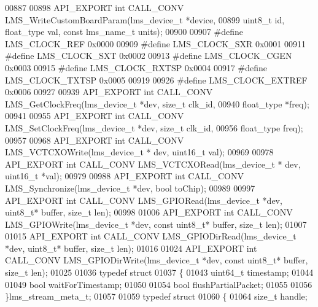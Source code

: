 \begin{DoxyCode}
00887 
00898 API_EXPORT \textcolor{keywordtype}{int} CALL_CONV LMS_WriteCustomBoardParam(lms\_device\_t *device,
00899                             uint8\_t \textcolor{keywordtype}{id}, float\_type val, \textcolor{keyword}{const} lms\_name\_t units);
00900 
00907 \textcolor{preprocessor}{#define LMS\_CLOCK\_REF    0x0000}
00909 \textcolor{preprocessor}{#define LMS\_CLOCK\_SXR    0x0001}
00911 \textcolor{preprocessor}{#define LMS\_CLOCK\_SXT    0x0002}
00913 \textcolor{preprocessor}{#define LMS\_CLOCK\_CGEN   0x0003}
00915 \textcolor{preprocessor}{#define LMS\_CLOCK\_RXTSP  0x0004}
00917 \textcolor{preprocessor}{#define LMS\_CLOCK\_TXTSP  0x0005}
00919 
00926 \textcolor{preprocessor}{#define LMS\_CLOCK\_EXTREF 0x0006}
00927 
00939 API_EXPORT \textcolor{keywordtype}{int} CALL_CONV LMS_GetClockFreq(lms\_device\_t *dev, \textcolor{keywordtype}{size\_t} clk_id,
00940                                          float\_type *freq);
00941 
00955 API_EXPORT \textcolor{keywordtype}{int} CALL_CONV LMS_SetClockFreq(lms\_device\_t *dev, \textcolor{keywordtype}{size\_t} clk_id,
00956                                          float\_type freq);
00957 
00968 API_EXPORT \textcolor{keywordtype}{int} CALL_CONV LMS_VCTCXOWrite(lms\_device\_t * dev, uint16\_t val);
00969 
00978 API_EXPORT \textcolor{keywordtype}{int} CALL_CONV LMS_VCTCXORead(lms\_device\_t * dev, uint16\_t *val);
00979 
00988 API_EXPORT \textcolor{keywordtype}{int} CALL_CONV LMS_Synchronize(lms\_device\_t *dev, \textcolor{keywordtype}{bool} toChip);
00989 
00997 API_EXPORT \textcolor{keywordtype}{int} CALL_CONV LMS_GPIORead(lms\_device\_t *dev, uint8\_t* buffer, \textcolor{keywordtype}{size\_t} 
      len);
00998 
01006 API_EXPORT \textcolor{keywordtype}{int} CALL_CONV LMS_GPIOWrite(lms\_device\_t *dev, \textcolor{keyword}{const} uint8\_t* buffer, \textcolor{keywordtype}{size\_t} 
      len);
01007 
01015 API_EXPORT \textcolor{keywordtype}{int} CALL_CONV LMS_GPIODirRead(lms\_device\_t *dev, uint8\_t* buffer, \textcolor{keywordtype}{size\_t} 
      len);
01016 
01024 API_EXPORT \textcolor{keywordtype}{int} CALL_CONV LMS_GPIODirWrite(lms\_device\_t *dev, \textcolor{keyword}{const} uint8\_t* 
      buffer, \textcolor{keywordtype}{size\_t} len);
01025 
01036 \textcolor{keyword}{typedef} \textcolor{keyword}{struct}
01037 \{
01043     uint64\_t timestamp;
01044 
01049     \textcolor{keywordtype}{bool} waitForTimestamp;
01050 
01054     \textcolor{keywordtype}{bool} flushPartialPacket;
01055 
01056 \}lms_stream_meta_t;
01057 
01059 \textcolor{keyword}{typedef} \textcolor{keyword}{struct}
01060 \{
01064     \textcolor{keywordtype}{size\_t} handle;

\end{DoxyCode}
